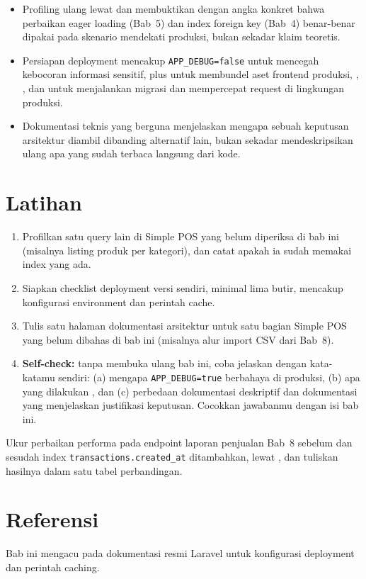 \begin{itemize}
  \item Profiling ulang lewat  dan
     membuktikan dengan angka konkret bahwa
    perbaikan eager loading (Bab~5) dan index foreign key (Bab~4)
    benar-benar dipakai pada skenario mendekati produksi, bukan sekadar
    klaim teoretis.
  \item Persiapan deployment mencakup \texttt{APP\_DEBUG=false} untuk
    mencegah kebocoran informasi sensitif, plus 
    untuk membundel aset frontend produksi, ,
    , dan  untuk
    menjalankan migrasi dan mempercepat request di lingkungan produksi.
  \item Dokumentasi teknis yang berguna menjelaskan mengapa sebuah
    keputusan arsitektur diambil dibanding alternatif lain, bukan
    sekadar mendeskripsikan ulang apa yang sudah terbaca langsung dari
    kode.
\end{itemize}

\section{Latihan}

\begin{enumerate}
  \item Profilkan satu query lain di Simple POS yang belum diperiksa di
    bab ini (misalnya listing produk per kategori), dan catat apakah
    ia sudah memakai index yang ada.
  \item Siapkan checklist deployment versi sendiri, minimal lima butir,
    mencakup konfigurasi environment dan perintah cache.
  \item Tulis satu halaman dokumentasi arsitektur untuk satu bagian
    Simple POS yang belum dibahas di bab ini (misalnya alur import CSV
    dari Bab~8).
  \item \textbf{Self-check:} tanpa membuka ulang bab ini, coba jelaskan
    dengan kata-katamu sendiri: (a) mengapa \texttt{APP\_DEBUG=true}
    berbahaya di produksi, (b) apa yang dilakukan
    , dan (c) perbedaan dokumentasi deskriptif
    dan dokumentasi yang menjelaskan justifikasi keputusan. Cocokkan
    jawabanmu dengan isi bab ini.
\end{enumerate}

\begin{challengebox}
Ukur perbaikan performa pada endpoint laporan penjualan Bab~8 sebelum
dan sesudah index \texttt{transactions.created\_at} ditambahkan, lewat
, dan tuliskan hasilnya dalam satu tabel
perbandingan.
\end{challengebox}

\section{Referensi}

Bab ini mengacu pada dokumentasi resmi Laravel \cite{laraveldocs} untuk
konfigurasi deployment dan perintah caching.
